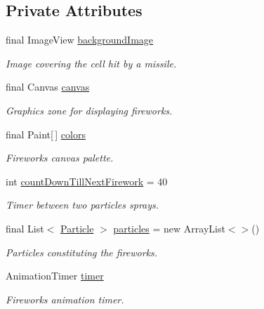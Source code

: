 \subsection*{Private Attributes}
\begin{DoxyCompactItemize}
\item 
final Image\-View \hyperlink{classbattleship2D_1_1ui_1_1Explosion_aec53964ab689b670e6e25b23669aaf70}{background\-Image}
\begin{DoxyCompactList}\small\item\em Image covering the cell hit by a missile. \end{DoxyCompactList}\item 
final Canvas \hyperlink{classbattleship2D_1_1ui_1_1Explosion_a7df261722990b64d7ef22ba25786bb54}{canvas}
\begin{DoxyCompactList}\small\item\em Graphics zone for displaying fireworks. \end{DoxyCompactList}\item 
final Paint\mbox{[}$\,$\mbox{]} \hyperlink{classbattleship2D_1_1ui_1_1Explosion_ac77ea2908aa3d5de71096df02623a018}{colors}
\begin{DoxyCompactList}\small\item\em Fireworks canvas palette. \end{DoxyCompactList}\item 
int \hyperlink{classbattleship2D_1_1ui_1_1Explosion_a5ebd846be63f323f45e95038f9941cb3}{count\-Down\-Till\-Next\-Firework} = 40
\begin{DoxyCompactList}\small\item\em Timer between two particles sprays. \end{DoxyCompactList}\item 
final List$<$ \hyperlink{classbattleship2D_1_1ui_1_1Particle}{Particle} $>$ \hyperlink{classbattleship2D_1_1ui_1_1Explosion_a4433fee8590870ce4f7d23d96efabb39}{particles} = new Array\-List$<$$>$()
\begin{DoxyCompactList}\small\item\em Particles constituting the fireworks. \end{DoxyCompactList}\item 
Animation\-Timer \hyperlink{classbattleship2D_1_1ui_1_1Explosion_a776b8d79ca23a39ec19567138498baf6}{timer}
\begin{DoxyCompactList}\small\item\em Fireworks animation timer. \end{DoxyCompactList}\end{DoxyCompactItemize}



